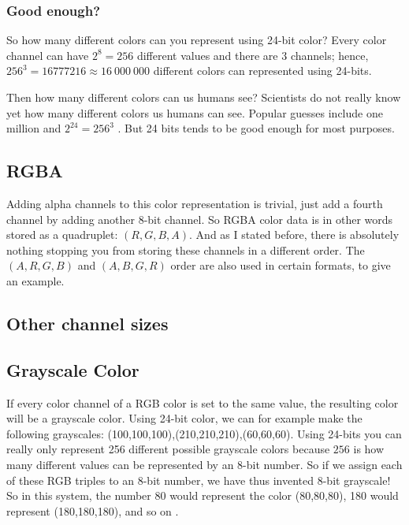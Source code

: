 \subsubsection{Good enough?}

So how many different colors can you represent using 24-bit color?
Every color channel can have $2^8 = 256$ different values and there
are $3$ channels; hence, $256^3 = 16777216 \approx 16\ 000\ 000$ different colors
can represented using 24-bits.

Then how many different colors can us humans see? Scientists do not
really know yet how many different colors us humans can see. Popular
guesses include one million \cite{roth:_tetrachromat} and $2^{24} =
256^3$ \cite{murray1996encyclopedia}. But 24 bits tends to be good
enough for most purposes.

\subsection{RGBA}

Adding alpha channels to this color representation is trivial, just
add a fourth channel by adding another 8-bit channel. So RGBA color
data is in other words stored as a quadruplet: $(R,G,B,A)$. And as I
stated before, there is absolutely nothing stopping you from storing these
channels in a different order. The $(A,R,G,B)$ and $(A,B,G,R)$ order are also
used in certain formats, to give an example.

\subsection{Other channel sizes}

\subsection{Grayscale Color}

\newcommand{\selfrgbtrip}[3]{\mbox{\textcolor[RGB]{#1,#2,#3}{(#1,#2,#3)}}}
\newcommand{\selfrgbtripgray}[1]{\selfrgbtrip{#1}{#1}{#1}}

If every color channel of a RGB color is set to the same value, the
resulting color will be a grayscale color. Using 24-bit color, we can for example make the following
grayscales:
\selfrgbtripgray{100},\selfrgbtripgray{210},\selfrgbtripgray{60}. Using
24-bits you can really only represent 256 different possible
grayscale colors because $256$ is how many different values can be
represented by an 8-bit number. So if we assign each of these RGB
triples to an 8-bit number, we have thus invented 8-bit
grayscale! So in this system, the number 80
would represent the color \selfrgbtripgray{80}, 180 would represent
\selfrgbtripgray{180}, and so on \cite{puglia00:_handbook_dig_proj}.

